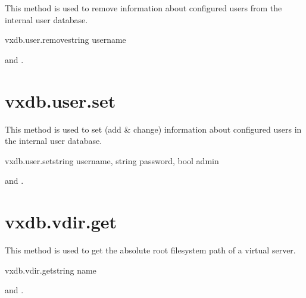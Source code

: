 This method is used to remove information about configured users from the
internal user database.

\begin{rpcsynopsis}{vxdb.user.remove}{string username}
\end{rpcsynopsis}

\begin{rpcaccess}
 and \rpcnoownerchecks.
\end{rpcaccess}

\rpcreturnnil

\rpcnoerrors


\section{vxdb.user.set}

This method is used to set (add \& change) information about configured users
in the internal user database.

\begin{rpcsynopsis}{vxdb.user.set}{string username, string password,
	bool admin}
\end{rpcsynopsis}

\begin{rpcaccess}
 and \rpcnoownerchecks.
\end{rpcaccess}

\rpcreturnnil

\rpcnoerrors


\section{vxdb.vdir.get}

This method is used to get the absolute root filesystem path of a virtual
server.

\begin{rpcsynopsis}{vxdb.vdir.get}{string name}
\end{rpcsynopsis}

\begin{rpcaccess}
 and \rpcnoownerchecks.
\end{rpcaccess}

